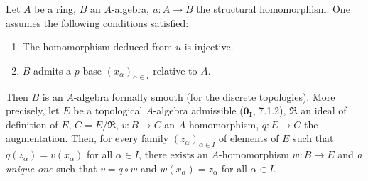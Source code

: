 \begin{theorem}[21.2.7]
\label{0.21.2.7}
Let $A$ be a ring, $B$ an $A$-algebra, $u:A\to B$ the structural homomorphism.
One assumes the following conditions satisfied:
\begin{enumerate}
  \item[\rm(i)] The homomorphism  deduced from $u$ is injective.
  \item[\rm(ii)] $B$ admits a $p$-base $(x_\alpha)_{\alpha\in I}$ relative to $A$.
\end{enumerate}
Then $B$ is an $A$-algebra formally smooth \textup{(}for the discrete topologies\textup{)}.
More precisely, let $E$ be a topological $A$-algebra admissible ($\mathbf{0_I}$, 7.1.2), $\mathfrak{R}$ an ideal of definition of $E$, $C=E/\mathfrak{R}$, $v:B\to C$ an $A$-homomorphism, $q:E\to C$ the augmentation.
Then, for every family $(z_\alpha)_{\alpha\in I}$ of elements of $E$ such that $q(z_\alpha)=v(x_\alpha)$ for all $\alpha\in I$, there exists an $A$-homomorphism $w:B\to E$ and \emph{a unique one} such that $v=q\circ w$ and $w(x_\alpha)=z_\alpha$ for all $\alpha\in I$.
\end{theorem}

